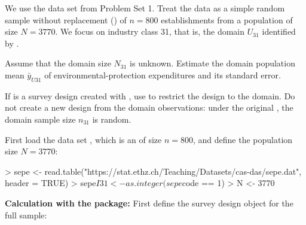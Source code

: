 



\begin{Problem}\label{problem:domain}
    We use the data set  from Problem Set 1. Treat the data
    as a simple random sample without replacement (\SRS) of $n = 800$
    establishments from a population of size $N = 3770$. We focus on industry
    class 31, that is, the domain $U_{31}$ identified by .

\begin{Subtask}
    \item Assume that the domain size $N_{31}$ is unknown. Estimate the domain
        population mean $\bar{y}_{U31}$ of environmental-protection
        expenditures and its standard error.

        \begin{Rhint}
            If  is a survey design created with ,
            use  to restrict the design to the
            domain. Do not create a new \SRS design from the domain
            observations: under the original \SRS, the domain sample size
            $n_{31}$ is random.
        \end{Rhint}

    \begin{Solution}
        First load the data set , which is an \SRS of size
        $n=800$, and define the population size $N=3770$:


\begin{Schunk}
\begin{Sinput}
> sepe <- read.table("https://stat.ethz.ch/Teaching/Datasets/cas-das/sepe.dat",
                     header = TRUE)
> sepe$I31 <- as.integer(sepe$code == 1)
> N <- 3770
\end{Sinput}
\end{Schunk}

        \textbf{Calculation with the  package:} First define the
        survey design object for the full sample:

\begin{Schunk}
\end{Schunk}


\end{Solution}
\end{Subtask}
\end{Problem}
